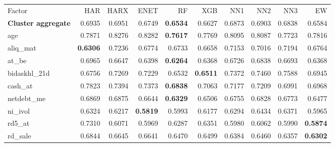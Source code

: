 \begin{longtable}{>{\raggedright\arraybackslash}p{2.6cm}rrrrrrrrr}
\hline
\multicolumn{10}{@{}l}{\textit{Panel D. Low Leverage}} \\
\hline
Factor & HAR & HARX & ENET & RF & XGB & NN1 & NN2 & NN3 & EW \\
\hline
\textbf{Cluster aggregate} & 0.6935 & 0.6951 & \cellcolor{blue!10}0.6749 & \textbf{\cellcolor{blue!10}0.6534} & \cellcolor{blue!10}0.6627 & \cellcolor{blue!10}0.6873 & \cellcolor{blue!10}0.6903 & \cellcolor{blue!10}0.6838 & \cellcolor{blue!10}0.6584 \\
age & 0.7871 & 0.8276 & 0.8282 & \textbf{\cellcolor{blue!10}0.7617} & \cellcolor{blue!10}0.7769 & 0.8095 & 0.8087 & \cellcolor{blue!10}0.7723 & \cellcolor{blue!10}0.7816 \\
aliq\_mat & \textbf{0.6306} & 0.7236 & 0.6774 & 0.6733 & 0.6658 & 0.7153 & 0.7016 & 0.7194 & 0.6764 \\
at\_be & 0.6965 & \cellcolor{blue!10}0.6647 & \cellcolor{blue!10}0.6398 & \textbf{\cellcolor{blue!10}0.6264} & \cellcolor{blue!10}0.6368 & \cellcolor{blue!10}0.6726 & \cellcolor{blue!10}0.6838 & \cellcolor{blue!10}0.6693 & \cellcolor{blue!10}0.6368 \\
bidaskhl\_21d & 0.6756 & 0.7269 & 0.7229 & \cellcolor{blue!10}0.6532 & \textbf{\cellcolor{blue!10}0.6511} & 0.7372 & 0.7460 & 0.7588 & 0.6945 \\
cash\_at & 0.7823 & \cellcolor{blue!10}0.7394 & \cellcolor{blue!10}0.7373 & \textbf{\cellcolor{blue!10}0.6838} & \cellcolor{blue!10}0.7063 & \cellcolor{blue!10}0.7177 & \cellcolor{blue!10}0.7209 & \cellcolor{blue!10}0.6991 & \cellcolor{blue!10}0.6968 \\
netdebt\_me & 0.6869 & 0.6875 & \cellcolor{blue!10}0.6644 & \textbf{\cellcolor{blue!10}0.6329} & \cellcolor{blue!10}0.6506 & \cellcolor{blue!10}0.6755 & \cellcolor{blue!10}0.6828 & \cellcolor{blue!10}0.6773 & \cellcolor{blue!10}0.6477 \\
ni\_ivol & 0.6324 & \cellcolor{blue!10}0.6217 & \textbf{\cellcolor{blue!10}0.5819} & \cellcolor{blue!10}0.5993 & \cellcolor{blue!10}0.6177 & \cellcolor{blue!10}0.6294 & 0.6434 & 0.6371 & \cellcolor{blue!10}0.5965 \\
rd5\_at & 0.7310 & \cellcolor{blue!10}0.6071 & \cellcolor{blue!10}0.5969 & \cellcolor{blue!10}0.6287 & \cellcolor{blue!10}0.6351 & \cellcolor{blue!10}0.5980 & \cellcolor{blue!10}0.6062 & \cellcolor{blue!10}0.5990 & \textbf{\cellcolor{blue!10}0.5874} \\
rd\_sale & 0.6844 & \cellcolor{blue!10}0.6645 & \cellcolor{blue!10}0.6641 & \cellcolor{blue!10}0.6470 & \cellcolor{blue!10}0.6499 & \cellcolor{blue!10}0.6384 & \cellcolor{blue!10}0.6460 & \cellcolor{blue!10}0.6357 & \textbf{\cellcolor{blue!10}0.6302} \\

\end{longtable}
